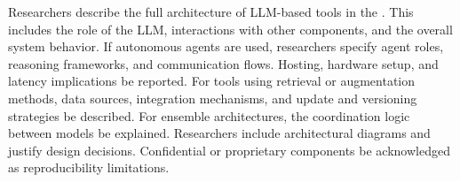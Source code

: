 Researchers \must describe the full architecture of LLM-based tools in the \paper. This includes the role of the LLM, interactions with other components, and the overall system behavior. If autonomous agents are used, researchers \must specify agent roles, reasoning frameworks, and communication flows. Hosting, hardware setup, and latency implications \must be reported. For tools using retrieval or augmentation methods, data sources, integration mechanisms, and update and versioning strategies \must be described. For ensemble architectures, the coordination logic between models \must be explained. Researchers \should include architectural diagrams and justify design decisions. Confidential or proprietary components \must be acknowledged as reproducibility limitations.